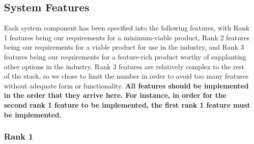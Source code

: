 \doublespacing

\subsection{System Features}

Each system component has been specified into the following features, with Rank 1 features being our requirements for a minimum-viable product, Rank 2 features being our requirements for a viable product for use in the industry, and Rank 3 features being our requirements for a feature-rich product worthy of supplanting other options in the industry. Rank 3 features are relatively complex to the rest of the stack, so we chose to limit the number in order to avoid too many features without adequate form or functionality. \textbf{All features should be implemented in the order that they arrive here. For instance, in order for the second rank 1 feature to be implemented, the first rank 1 feature must be implemented.}

\subsubsection{Rank 1}

